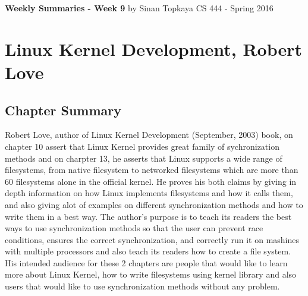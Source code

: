 \documentclass[letterpaper,10pt,draftclsnofoot,onecolumn]{IEEEtran}
\begin{document}
\begin{titlepage}
	
	\begin{center}
	\bigbreak
	\textbf{Weekly Summaries - Week 9}
	\bigbreak
	by Sinan Topkaya
	\smallbreak
	CS 444 - Spring 2016
	\end{center}
\end{titlepage}
	
\section*{Linux Kernel Development, Robert Love}
\subsection*{Chapter Summary}

Robert Love, author of Linux Kernel Development (September, 2003) book, on chapter 10 assert that Linux Kernel provides great family of sychronization methods and on charpter 13, he asserts that Linux supports a wide range of filesystems, from native filesystem to networked filesystems which are more than 60 filesystems alone in the official kernel. He proves his both claims by giving in depth information on how Linux implements filesystems and how it calls them, and also giving alot of examples on different synchronization methods and how to write them in a best way. The author’s purpose is to teach its readers the best ways to use synchronization methods so that the user can prevent race conditions, ensures the correct synchronization, and correctly run it on mashines with multiple processors and also teach its readers how to create a file system. His intended audience for these 2 chapters are people that would like to learn more about Linux Kernel, how to write filesystems using kernel library and also users that would like to use synchronization methods without any problem.
\end{document}
